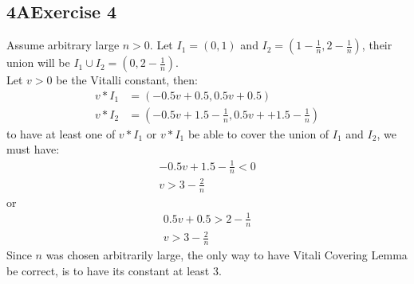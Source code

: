 \documentclass[12pt, letterpaper]{article}
\begin{document}
\subsection*{4\hspace{1pt}A\hspace{20pt}Exercise 4}
Assume arbitrary large $n>0$. Let $I_1=(0,1)$ and $I_2=(1-\frac{1}{n}, 2-\frac{1}{n})$, their union will be $I_1\cup I_2=(0,2-\frac{1}{n})$.\\
Let $v>0$ be the Vitalli constant, then:
\begin{align*}
    v*I_1&=(-0.5v+0.5,0.5v+0.5)\\
    v*I_2&=(-0.5v+1.5-\frac{1}{n},0.5v++1.5-\frac{1}{n})
\end{align*}
to have at least one of $v*I_1$ or $v*I_1$ be able to cover the union of $I_1$ and $I_2$, we must have:
\begin{align*}
    -0.5v+1.5-\frac{1}{n}<0\\
    v>3-\frac{2}{n}
\end{align*}
or
\begin{align*}
    0.5v+0.5>2-\frac{1}{n}\\
    v>3-\frac{2}{n}
\end{align*}
Since $n$ was chosen arbitrarily large, the only way to have Vitali Covering Lemma be correct, is to have its constant at least 3.
\clearpage
\end{document}
